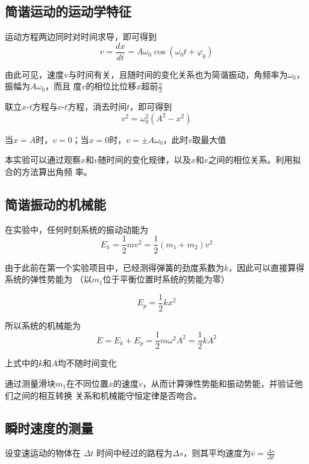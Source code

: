 \documentclass[UTF8]{article}
\theoremstyle{MyLineTheoremStyle} %
\theoremstyle{MyBlockTheoremStyle} %
\theoremstyle{MySubsubsectionStyle} %
\begin{document}
\subsection{简谐运动的运动学特征}
运动方程两边同时对时间求导，即可得到
\begin{equation}
    v = \frac{{dx}}{{dt}} = A{\omega _0}\cos \left( {{\omega _0}t + {\varphi _0}} \right)
\end{equation}

由此可见，速度v与时间有关，且随时间的变化关系也为简谐振动，角频率为$\omega_0$，振幅为$A \omega_0$，而且
度$v$的相位比位移$x$超前$\frac{\pi}{2}$

联立$x$-$t$方程与$v$-$t$方程，消去时间$t$，即可得到
\begin{equation}
    {v^2} = \omega _0^2\left( {{A^2} - {x^2}} \right)
\end{equation}

当$x=A$时，$v=0$；当$x=0$时，$v =  \pm A{\omega _0}$，此时$v$取最大值

本实验可以通过观察$x$和$v$随时间的变化规律，以及$x$和$v$之间的相位关系。利用拟合的方法算出角频
率。

\subsection{简谐振动的机械能}
在实验中，任何时刻系统的振动动能为
\begin{equation}
    {E_k} = \frac{1}{2}m{v^2} = \frac{1}{2}\left( {{m_1} + {m_2}} \right){v^2}
\end{equation}

由于此前在第一个实验项目中，已经测得弹簧的劲度系数为$k$，因此可以直接算得系统的弹性势能为
（以$m_1$位于平衡位置时系统的势能为零）

\begin{equation}
    {E_p} = \frac{1}{2}k{x^2}
\end{equation}

所以系统的机械能为
\begin{equation}
    E = {E_k} + {E_p} = \frac{1}{2}m{\omega ^2}{A^2} = \frac{1}{2}k{A^2}
\end{equation}

上式中的$k$和$A$均不随时间变化

通过测量滑块$m_1$在不同位置$x$的速度$v$，从而计算弹性势能和振动势能，并验证他们之间的相互转换
关系和机械能守恒定律是否吻合。

\subsection{瞬时速度的测量}
设变速运动的物体在 $\Delta t$ 时间中经过的路程为$\Delta s$，则其平均速度为$\overline v  = \frac{{\Delta s}}{{\Delta t}}$
\end{document}
